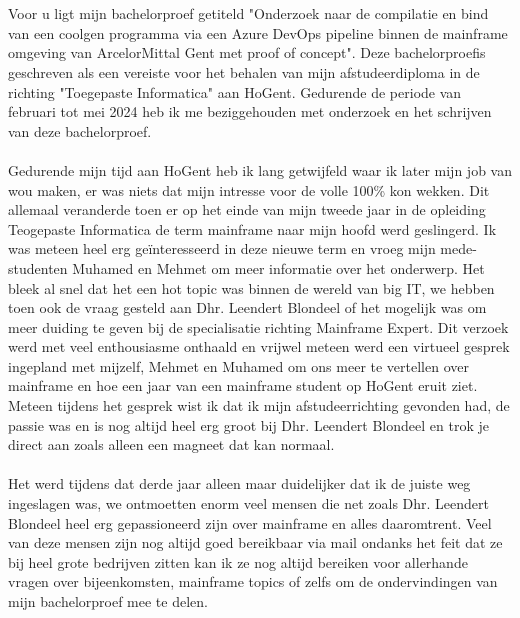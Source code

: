 
\chapter*{}%
\label{ch:voorwoord}

Voor u ligt mijn bachelorproef getiteld "Onderzoek naar de compilatie en bind van een coolgen programma via een Azure DevOps pipeline binnen de mainframe omgeving van ArcelorMittal Gent met proof of concept". 
Deze bachelorproefis geschreven als een vereiste voor het behalen van mijn afstudeerdiploma in de richting "Toegepaste Informatica" aan HoGent.
Gedurende de periode van februari tot mei 2024 heb ik me beziggehouden met onderzoek en het schrijven van deze bachelorproef. 
\\ \\
Gedurende mijn tijd aan HoGent heb ik lang getwijfeld waar ik later mijn job van wou maken, er was niets dat mijn intresse voor de volle 100\% kon wekken. 
Dit allemaal veranderde toen er op het einde van mijn tweede jaar in de opleiding Teogepaste Informatica de term mainframe naar mijn hoofd werd geslingerd. 
Ik was meteen heel erg geïnteresseerd in deze nieuwe term en vroeg mijn mede-studenten Muhamed en Mehmet om meer informatie over het onderwerp. 
Het bleek al snel dat het een hot topic was binnen de wereld van big IT, we hebben toen ook de vraag gesteld aan Dhr. Leendert Blondeel of het mogelijk was om meer duiding te geven bij de specialisatie richting Mainframe Expert. 
Dit verzoek werd met veel enthousiasme onthaald en vrijwel meteen werd een virtueel gesprek ingepland met mijzelf, Mehmet en Muhamed om ons meer te vertellen over mainframe en hoe een jaar van een mainframe student op HoGent eruit ziet.
Meteen tijdens het gesprek wist ik dat ik mijn afstudeerrichting gevonden had, de passie was en is nog altijd heel erg groot bij Dhr. Leendert Blondeel en trok je direct aan zoals alleen een magneet dat kan normaal. 
\\ \\
Het werd tijdens dat derde jaar alleen maar duidelijker dat ik de juiste weg ingeslagen was, we ontmoetten enorm veel mensen die net zoals Dhr. Leendert Blondeel heel erg gepassioneerd zijn over mainframe en alles daaromtrent. 
Veel van deze mensen zijn nog altijd goed bereikbaar via mail ondanks het feit dat ze bij heel grote bedrijven zitten kan ik ze nog altijd bereiken voor allerhande vragen over bijeenkomsten, mainframe topics of zelfs om de ondervindingen van mijn bachelorproef mee te delen. 
